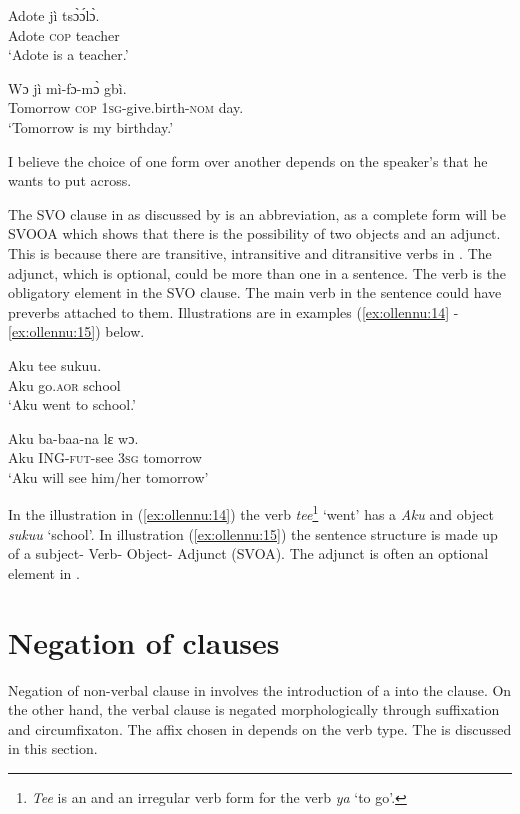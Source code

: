 \documentclass[output=paper
,newtxmath
,modfonts
,nonflat]{langsci/langscibook}
\begin{document}
\ea \label{ex:ollennu:12}
\gll Adote j\`i ts\`ɔ\'ɔl\`ɔ.\\
Adote \textsc{cop} teacher\\
\glt`Adote is a teacher.'
\z

\ea \label{ex:ollennu:13}
\gll Wɔ j\`i m\`i-fɔ-m\`ɔ gb\`i.\\
Tomorrow \textsc{cop} 1\textsc{sg}-give.birth-\textsc{nom} day.\\
\glt `Tomorrow is my birthday.'
\z


I believe the choice of one form over another depends on the speaker’s  that he wants to put across.

The SVO clause in  as discussed by \citet{Dakubu2003} is an abbreviation, as a complete form will be SVOOA which shows that there is the possibility of two objects and an adjunct. This is because there are transitive, intransitive and ditransitive verbs in . The adjunct, which is optional, could be more than one in a sentence. The verb is the obligatory element in the SVO clause. The main verb in the sentence could have preverbs attached to them. Illustrations are in examples (\ref{ex:ollennu:14} -\ref{ex:ollennu:15}) below.

\ea \label{ex:ollennu:14}
\gll Aku tee sukuu.\\
Aku go.\textsc{aor} school\\
\glt `Aku went to school.'
\z

\ea \label{ex:ollennu:15}
 \gll Aku ba-baa-na lɛ wɔ.\\
Aku ING-\textsc{fut}-see 3\textsc{sg} tomorrow\\
\glt`Aku will see him/her tomorrow'
\z


In the illustration in (\ref{ex:ollennu:14}) the verb \textit{tee}\footnote{\textit{Tee} is an  and an irregular verb form for the verb \textit{ya} `to go'.} `went' has a  \textit{Aku} and object \textit{sukuu} `school'. In illustration (\ref{ex:ollennu:15}) the sentence structure is made up of a subject- Verb- Object- Adjunct (SVOA). The adjunct is often an optional element in .

\section{\label{sec:ollennu:2} Negation of clauses}


Negation of non-verbal clause in  involves the introduction of a  into the clause. On the other hand, the verbal clause is negated morphologically through suffixation and circumfixaton. The affix chosen in  depends on the verb type. The   is discussed in this section.
\end{document}
